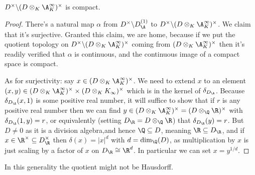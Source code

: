 \begin{theorem}
  \label{DivisionAlgebra.units_cocompact'}
  $D^\times\backslash(D\otimes_K\A_K^\infty)^\times$ is compact.
\end{theorem}
\begin{proof}
  There's a natural map $\alpha$ from $D^\times\backslash D_{\A}^{(1)}$ to
  $D^\times\backslash (D\otimes_K \A_K^\infty)^\times$. We claim that it's
  surjective. Granted this claim, we are home, because if we put the quotient
  topology on $D^\times\backslash (D\otimes_K \A_K^\infty)^\times$ coming from
  $(D\otimes_K \A_K^\infty)^\times$ then it's readily verified that $\alpha$
  is continuous, and the continuous image of a compact space is compact.

  As for surjectivity: say $x\in (D\otimes_K \A_K^\infty)^\times$. We need to extend
  $x$ to an element $(x,y)\in (D\otimes_K \A_K^\infty)^\times\times(D\otimes_K K_\infty)^\times$
  which is in the kernel of $\delta_{D_{\A}}$. Because $\delta_{D_{\A}}(x,1)$ is some positive
  real number, it will suffice to show that if $r$ is any positive real number then we can
  find $y\in (D\otimes_K \A_K^\infty)^\times=(D\otimes_{\Q}\R)^\times$ with $\delta_{D_{\A}}(1,y)=r$,
  or equivalently (setting $D_{\R}=D\otimes_{\Q}\R$) that $\delta_{D_{\R}}(y)=r$.
  But $D\not=0$ as it is a division algebra,and hence $\Q\subseteq D$, meaning
  $\R\subseteq D_{\R}$, and if
  $x\in\R^\times\subseteq D_{\R}^\times$ then $\delta(x)=|x|^d$ with $d=\dim_{\Q}(D)$,
  as multiplication by $x$ is just scaling by a factor of $x$ on $D_{\R}\cong\R^d$.
  In particular we can set $x=y^{1/d}$.
\end{proof}
\begin{remark} In this generality the quotient might not be Hausdorff.
\end{remark}
